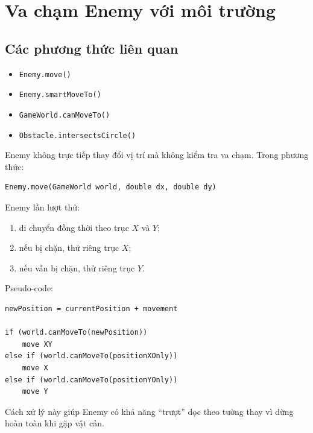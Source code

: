 \documentclass[12pt,a4paper]{report}
\begin{document}


    \section{Va chạm Enemy với môi trường}

    \subsection{Các phương thức liên quan}

    \begin{itemize}
        \item \texttt{Enemy.move()}
        \item \texttt{Enemy.smartMoveTo()}
        \item \texttt{GameWorld.canMoveTo()}
        \item \texttt{Obstacle.intersectsCircle()}
    \end{itemize}

    Enemy không trực tiếp thay đổi vị trí mà không kiểm tra va chạm.
    Trong phương thức:

    \begin{verbatim}
Enemy.move(GameWorld world, double dx, double dy)
    \end{verbatim}

    Enemy lần lượt thử:

    \begin{enumerate}
        \item di chuyển đồng thời theo trục $X$ và $Y$;
        \item nếu bị chặn, thử riêng trục $X$;
        \item nếu vẫn bị chặn, thử riêng trục $Y$.
    \end{enumerate}

    Pseudo-code:

    \begin{verbatim}
newPosition = currentPosition + movement

if (world.canMoveTo(newPosition))
    move XY
else if (world.canMoveTo(positionXOnly))
    move X
else if (world.canMoveTo(positionYOnly))
    move Y
    \end{verbatim}

    Cách xử lý này giúp Enemy có khả năng ``trượt'' dọc theo tường
    thay vì dừng hoàn toàn khi gặp vật cản.
\end{document}
